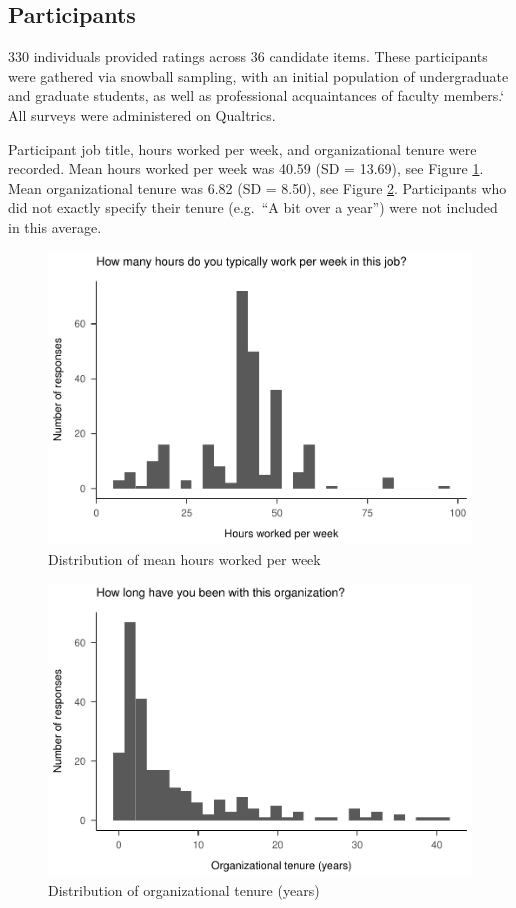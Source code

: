 \documentclass[
  english,
  man]{apa6}
\begin{document}
\hypertarget{participants}{%
\subsection{Participants}\label{participants}}

330 individuals provided ratings across 36 candidate items. These participants were gathered via snowball sampling, with an initial population of undergraduate and graduate students, as well as professional acquaintances of faculty members.` All surveys were administered on Qualtrics.

Participant job title, hours worked per week, and organizational tenure were recorded. Mean hours worked per week was 40.59 (SD = 13.69), see Figure \ref{fig:hours}. Mean organizational tenure was 6.82 (SD = 8.50), see Figure \ref{fig:tenure}. Participants who did not exactly specify their tenure (e.g.~``A bit over a year'') were not included in this average.

\begin{figure}
\centering
\includegraphics{SIOPpapaja_files/figure-latex/hours-1.pdf}
\caption{\label{fig:hours}Distribution of mean hours worked per week}
\end{figure}

\begin{figure}
\centering
\includegraphics{SIOPpapaja_files/figure-latex/tenure-1.pdf}
\caption{\label{fig:tenure}Distribution of organizational tenure (years)}
\end{figure}
\end{document}
